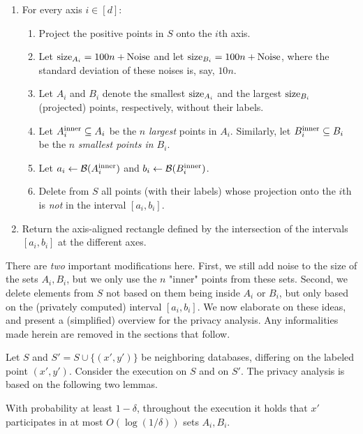 \documentclass[12pt,a4paper,oneside,onecolumn]{book}
\begin{document}
\begin{enumerate}[leftmargin=15pt]
    \item For every axis $i\in[d]$:
        \begin{enumerate}
        \item Project the positive points in $S$ onto the $i$th axis.
        \item Let ${\rm size}_{A_i}=100n+{\rm Noise}$ and let ${\rm size}_{B_i}=100n+{\rm Noise}$, where the standard deviation of these noises is, say, $10n$.
        \item Let $A_i$ and $B_i$ denote the smallest ${\rm size}_{A_i}$ and the largest ${\rm size}_{B_i}$ (projected) points, respectively, without their labels.
        \item Let $A_i^{\rm inner}\subseteq A_i$ be the $n$ {\em largest} points in $A_i$. Similarly, let $B_i^{\rm inner}\subseteq B_i$ be the $n$ {\em smallest points in $B_i$}.
        \item Let $a_i\leftarrow\mathcal{B}(A_i^{\rm inner})$ and $b_i\leftarrow\mathcal{B}(B_i^{\rm inner})$.
        \item Delete from $S$ all points (with their labels) whose projection onto the $i$th is {\em not} in the interval $[a_i,b_i]$.
    \end{enumerate}
    \item Return the axis-aligned rectangle defined by the intersection of the intervals $[a_i,b_i]$ at the different axes.
\end{enumerate}

There are {\em two} important modifications here. First, we still add noise to the size of the sets $A_i,B_i$, but we only use the $n$ "inner" points from these sets. Second, we delete elements from $S$ not based on them being inside $A_i$ or $B_i$, but only based on the (privately computed) interval $[a_i,b_i]$. 
We now elaborate on these ideas, and present a (simplified) overview for the privacy analysis. Any informalities made herein are removed in the sections that follow.

Let $S$ and $S'=S\cup\{(x',y')\}$ be neighboring databases, differing on the labeled point $(x',y')$. Consider the execution on $S$ and on $S'$. The privacy analysis is based on the following two lemmas.

\begin{lemma}[informal]
With probability at least $1-\delta$, throughout the execution it holds that $x'$ participates in at most $O(\log(1/\delta))$ sets $A_i,B_i$.
\end{lemma}
\end{document}
